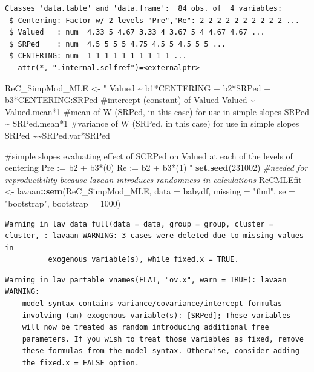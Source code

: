 \documentclass[
  11pt,
]{book}
\newenvironment{Shaded}{\begin{snugshade}}{\end{snugshade}}
\newcommand{\AttributeTok}[1]{\textcolor[rgb]{0.27,0.27,0.27}{#1}}
\newcommand{\CommentTok}[1]{\textcolor[rgb]{0.37,0.37,0.37}{\textit{#1}}}
\newcommand{\DecValTok}[1]{\textcolor[rgb]{0.06,0.06,0.06}{#1}}
\newcommand{\FunctionTok}[1]{\textcolor[rgb]{0.27,0.27,0.27}{\textbf{#1}}}
\newcommand{\NormalTok}[1]{#1}
\newcommand{\OtherTok}[1]{\textcolor[rgb]{0.37,0.37,0.37}{#1}}
\newcommand{\SpecialCharTok}[1]{\textcolor[rgb]{0.43,0.43,0.43}{\textbf{#1}}}
\newcommand{\StringTok}[1]{\textcolor[rgb]{0.5,0.5,0.5}{#1}}
\begin{document}
\begin{verbatim}
Classes 'data.table' and 'data.frame':  84 obs. of  4 variables:
 $ Centering: Factor w/ 2 levels "Pre","Re": 2 2 2 2 2 2 2 2 2 2 ...
 $ Valued   : num  4.33 5 4.67 3.33 4 3.67 5 4 4.67 4.67 ...
 $ SRPed    : num  4.5 5 5 5 4.75 4.5 5 4.5 5 5 ...
 $ CENTERING: num  1 1 1 1 1 1 1 1 1 1 ...
 - attr(*, ".internal.selfref")=<externalptr> 
\end{verbatim}

\begin{Shaded}
\begin{Highlighting}[]
\NormalTok{ReC\_SimpMod\_MLE }\OtherTok{\textless{}{-}} \StringTok{"}
\StringTok{    Valued \textasciitilde{} b1*CENTERING + b2*SRPed + b3*CENTERING:SRPed}
\StringTok{    }
\StringTok{    \#intercept (constant) of Valued}
\StringTok{    Valued \textasciitilde{} Valued.mean*1}
\StringTok{    \#mean of W (SRPed, in this case) for use in simple slopes}
\StringTok{    SRPed \textasciitilde{} SRPed.mean*1}
\StringTok{    \#variance of W (SRPed, in this case) for use in simple slopes}
\StringTok{    SRPed \textasciitilde{}\textasciitilde{}SRPed.var*SRPed}

\StringTok{    \#simple slopes evaluating effect of SCRPed on Valued at each of the levels of centering}
\StringTok{    Pre := b2 + b3*(0)}
\StringTok{    Re := b2 + b3*(1)}
\StringTok{"}
\FunctionTok{set.seed}\NormalTok{(}\DecValTok{231002}\NormalTok{)  }\CommentTok{\#needed for reproducibility because lavaan introduces randomness in calculations}
\NormalTok{ReCMLEfit }\OtherTok{\textless{}{-}}\NormalTok{ lavaan}\SpecialCharTok{::}\FunctionTok{sem}\NormalTok{(ReC\_SimpMod\_MLE, }\AttributeTok{data =}\NormalTok{ babydf, }\AttributeTok{missing =} \StringTok{"fiml"}\NormalTok{,}
    \AttributeTok{se =} \StringTok{"bootstrap"}\NormalTok{, }\AttributeTok{bootstrap =} \DecValTok{1000}\NormalTok{)}
\end{Highlighting}
\end{Shaded}

\begin{verbatim}
Warning in lav_data_full(data = data, group = group, cluster = cluster, : lavaan WARNING: 3 cases were deleted due to missing values in 
          exogenous variable(s), while fixed.x = TRUE.
\end{verbatim}

\begin{verbatim}
Warning in lav_partable_vnames(FLAT, "ov.x", warn = TRUE): lavaan WARNING:
    model syntax contains variance/covariance/intercept formulas
    involving (an) exogenous variable(s): [SRPed]; These variables
    will now be treated as random introducing additional free
    parameters. If you wish to treat those variables as fixed, remove
    these formulas from the model syntax. Otherwise, consider adding
    the fixed.x = FALSE option.
\end{verbatim}
\end{document}
